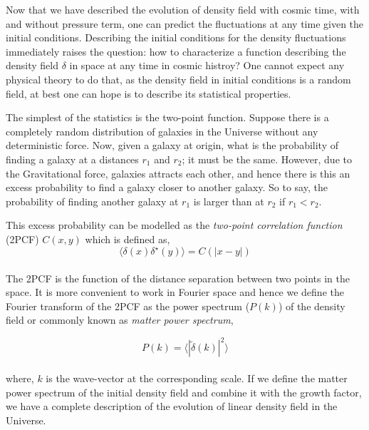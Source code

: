 Now that we have described the evolution of density field with cosmic time, with and
without pressure term, one can predict the fluctuations at any time given the initial
conditions. Describing the initial conditions for the density fluctuations immediately
raises the question: how to characterize a function describing the density field $\delta$
in space at any time in cosmic histroy? One cannot expect any physical theory to do that, as the density field
in initial conditions is a random field, at best one can hope is to describe its
statistical properties. 

The simplest of the statistics is the two-point function. Suppose there is a 
completely random distribution of galaxies in the Universe without any deterministic 
force. Now, given a galaxy at origin, what is the probability of finding a galaxy at a distances $r_1$ and $r_2$; it must be the same. 
However, due to the Gravitational force, galaxies attracts each other, and hence 
there is this an excess probability to find a galaxy closer to another galaxy. So to say, the probability of finding another galaxy at $r_1$ is larger than
at $r_2$ if $r_1<r_2$.

This excess probability can be modelled as the {\it two-point correlation function} (2PCF) 
$C(x,y)$ which is defined as, 
\begin{equation}
	\langle \delta(x) \delta^{\star}(y) \rangle = C(|x-y|)
\end{equation}
\\
The 2PCF is the function of the distance
separation between two points in the space. It is more convenient to work in 
Fourier space and hence we define the Fourier transform of the 2PCF as the 
power spectrum ($P(k)$) of the density field or commonly known as
{\it matter power spectrum},

\begin{equation}
		P(k)  =  \langle |\tilde{\delta}(k) |^2\rangle 
		\label{eqn:pkk}
\end{equation}
\\
where, $k$ is the wave-vector at the corresponding scale. If we 
define the matter power spectrum of the initial density field and combine
it with the growth factor, we have a complete description of the evolution 
of linear density field in the Universe. 

